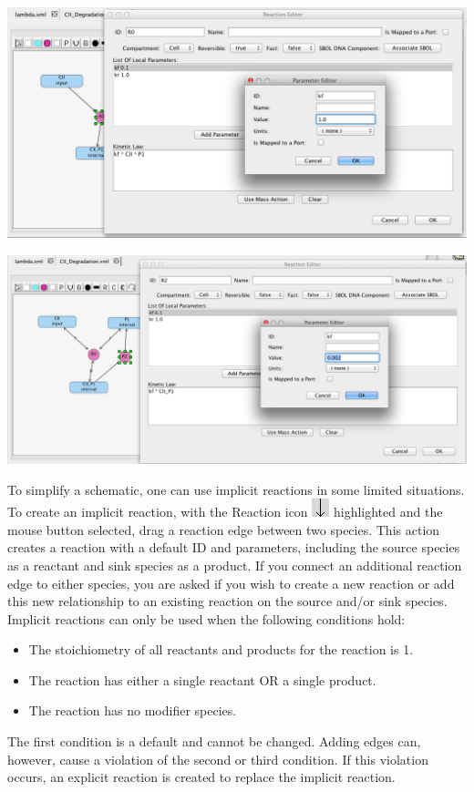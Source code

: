 \documentclass[titlepage,11pt]{article}
\begin{document}
\begin{center}
\includegraphics[width=155mm]{screenshots/localParam}
\end{center}

\begin{center}
\includegraphics[width=155mm]{screenshots/kineticLaw} 
\end{center}

To simplify a schematic, one can use implicit reactions in some limited situations.  To create an implicit reaction, with the Reaction icon \includegraphics{../gui/icons/modelview/reaction_selected} highlighted and the mouse button selected, drag a reaction edge between two species.  This action creates a reaction with a default ID and parameters, including the source species as a reactant and sink species as a product.  If you connect an additional reaction edge to either species, you are asked if you wish to create a new reaction or add this new relationship to an existing reaction on the source and/or sink species.  Implicit reactions can only be used when the following conditions hold:
\begin{itemize}
\item The stoichiometry of all reactants and products for the reaction is 1.
\item The reaction has either a single reactant OR a single product.
\item The reaction has no modifier species.
\end{itemize}
The first condition is a default and cannot be changed.  Adding edges can, however, cause a violation of the second or third condition.  If this violation occurs, an explicit reaction is created to replace the implicit reaction.
\end{document}
